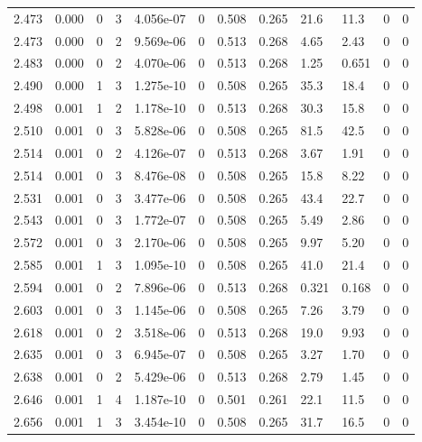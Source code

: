 \documentclass[preview]{standalone}
\begin{document}
{{{{{{\begin{tabular}{L{1.2cm}C{1.2cm} C{0.3cm}C{0.5cm} C{1.4cm}C{1.4cm} C{1.4cm}C{1.4cm} C{1.6cm}C{1.6cm} C{1.6cm}C{1.6cm}}
  2.473  &  0.000  & 0     &  3 &  4.056e-07  & 0  &  0.508&   0.265& 21.6 & 11.3   &  0 & 0  \\ 
  2.473  &  0.000  & 0     &  2 &  9.569e-06  & 0  &  0.513&   0.268& 4.65 & 2.43   &  0 & 0  \\ 
  2.483  &  0.000  & 0     &  2 &  4.070e-06  & 0  &  0.513&   0.268& 1.25 & 0.651   &  0 & 0  \\ 
  2.490  &  0.000  & 1     &  3 &  1.275e-10  & 0  &  0.508&   0.265& 35.3 & 18.4   &  0 & 0  \\ 
  2.498  &  0.001  & 1     &  2 &  1.178e-10  & 0  &  0.513&   0.268& 30.3 & 15.8   &  0 & 0  \\ 
  2.510  &  0.001  & 0     &  3 &  5.828e-06  & 0  &  0.508&   0.265& 81.5 & 42.5   &  0 & 0  \\ 
  2.514  &  0.001  & 0     &  2 &  4.126e-07  & 0  &  0.513&   0.268& 3.67 & 1.91   &  0 & 0  \\ 
  2.514  &  0.001  & 0     &  3 &  8.476e-08  & 0  &  0.508&   0.265& 15.8 & 8.22   &  0 & 0  \\ 
  2.531  &  0.001  & 0     &  3 &  3.477e-06  & 0  &  0.508&   0.265& 43.4 & 22.7   &  0 & 0  \\ 
  2.543  &  0.001  & 0     &  3 &  1.772e-07  & 0  &  0.508&   0.265& 5.49 & 2.86   &  0 & 0  \\ 
  2.572  &  0.001  & 0     &  3 &  2.170e-06  & 0  &  0.508&   0.265& 9.97 & 5.20   &  0 & 0  \\ 
  2.585  &  0.001  & 1     &  3 &  1.095e-10  & 0  &  0.508&   0.265& 41.0 & 21.4   &  0 & 0  \\ 
  2.594  &  0.001  & 0     &  2 &  7.896e-06  & 0  &  0.513&   0.268& 0.321 & 0.168   &  0 & 0  \\ 
  2.603  &  0.001  & 0     &  3 &  1.145e-06  & 0  &  0.508&   0.265& 7.26 & 3.79   &  0 & 0  \\ 
  2.618  &  0.001  & 0     &  2 &  3.518e-06  & 0  &  0.513&   0.268& 19.0 & 9.93   &  0 & 0  \\ 
  2.635  &  0.001  & 0     &  3 &  6.945e-07  & 0  &  0.508&   0.265& 3.27 & 1.70   &  0 & 0  \\ 
  2.638  &  0.001  & 0     &  2 &  5.429e-06  & 0  &  0.513&   0.268& 2.79 & 1.45   &  0 & 0  \\ 
  2.646  &  0.001  & 1     &  4 &  1.187e-10  & 0  &  0.501&   0.261& 22.1 & 11.5   &  0 & 0  \\ 
  2.656  &  0.001  & 1     &  3 &  3.454e-10  & 0  &  0.508&   0.265& 31.7 & 16.5   &  0 & 0  \\ 

\end{tabular}}}}}}}
\end{document}
